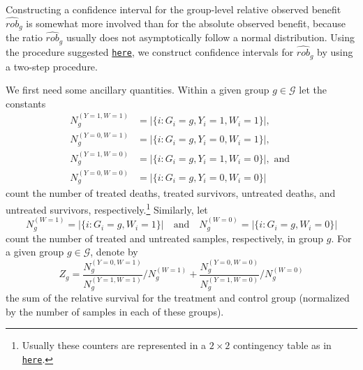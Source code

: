 \documentclass[11pt]{article}
\begin{document}
Constructing a confidence interval for the group-level relative observed benefit $\widehat{rob}_g$ is somewhat more involved than for the absolute observed benefit, because the ratio $\widehat{rob}_g$ usually does not asymptotically follow a normal distribution. Using the procedure suggested \href{https://sphweb.bumc.bu.edu/otlt/mph-modules/bs/bs704_confidence_intervals/bs704_confidence_intervals8.html}{\texttt{here}}, we construct confidence intervals for $\widehat{rob}_g$ by using a two-step procedure.

We first need some ancillary quantities. Within a given group $g \in \mathcal{G}$ let the constants
\begin{equation}
\begin{split}
    N_g^{(Y=1, W=1)} &= |\{i : G_i = g, Y_i = 1, W_i = 1\}|,
    \\
    N_g^{(Y=0, W=1)} &= |\{i : G_i = g, Y_i = 0, W_i = 1\}|,
    \\
    N_g^{(Y=1, W=0)} &= |\{i : G_i = g, Y_i = 1, W_i = 0\}|, \text{ and }
    \\
    N_g^{(Y=0, W=0)} &= |\{i : G_i = g, Y_i = 0, W_i = 0\}|
\end{split}
\end{equation}
count the number of treated deaths, treated survivors, untreated deaths, and untreated survivors, respectively.\footnote{Usually these counters are represented in a $2 \times 2$ contingency table as in \href{https://www.ncbi.nlm.nih.gov/pmc/articles/PMC2938757/}{\texttt{here}}.} Similarly, let
\begin{equation}
    N_g^{(W=1)} = |\{i : G_i = g, W_i = 1\}|
    \quad \text{and} \quad 
    N_g^{(W=0)} = |\{i : G_i = g, W_i = 0\}|
\end{equation}
count the number of treated and untreated samples, respectively, in group $g$. For a given group $g \in \mathcal{G}$, denote by 
\begin{equation}
    Z_g 
    =
    \frac{N_g^{(Y=0, W=1)}}{N_g^{(Y=1, W=1)}}
    \bigg/ N_g^{(W=1)}
    +
    \frac{N_g^{(Y=0, W=0)}}{N_g^{(Y=1, W=0)}}
    \bigg/ N_g^{(W=0)}
\end{equation}
the sum of the relative survival for the treatment and control group (normalized by the number of samples in each of these groups). 
\end{document}
